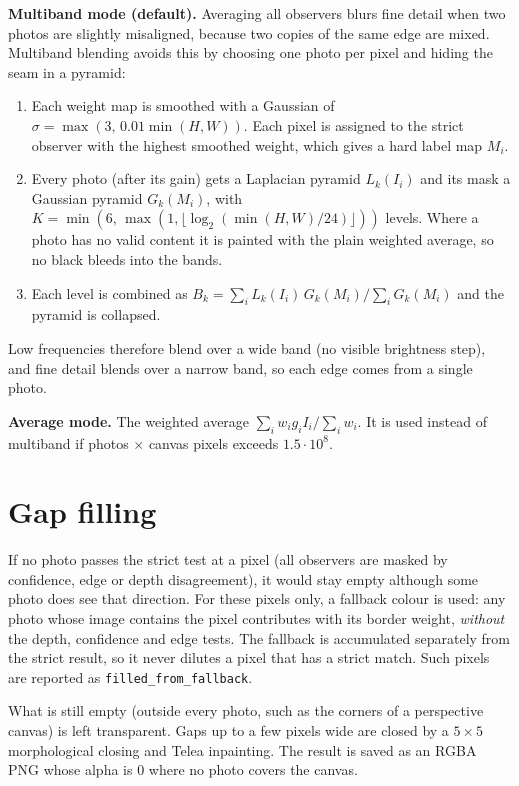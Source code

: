 \documentclass[11pt, a4paper]{article}
\begin{document}
\textbf{Multiband mode (default).} Averaging all observers blurs fine detail when two photos are slightly misaligned, because two copies of the same
edge are mixed. Multiband blending avoids this by choosing one photo per pixel and hiding the seam in a pyramid:
\begin{enumerate}
  \item Each weight map is smoothed with a Gaussian of $\sigma = \max(3,\,0.01\min(H,W))$. Each pixel is assigned to the strict
        observer with the highest smoothed weight, which gives a hard label map $M_i$.
  \item Every photo (after its gain) gets a Laplacian pyramid $L_k(I_i)$ and its mask a Gaussian pyramid $G_k(M_i)$, with
        $K = \min(6,\,\max(1,\lfloor\log_2(\min(H,W)/24)\rfloor))$ levels. Where a photo has no valid content it is painted
        with the plain weighted average, so no black bleeds into the bands.
  \item Each level is combined as $B_k = \sum_i L_k(I_i)\,G_k(M_i) \big/ \sum_i G_k(M_i)$ and the pyramid is collapsed.
\end{enumerate}
Low frequencies therefore blend over a wide band (no visible brightness step), and fine detail blends over a narrow band, so each edge comes from a single photo.

\textbf{Average mode.} The weighted average $\sum_i w_i g_i I_i / \sum_i w_i$. It is used instead of multiband if photos
$\times$ canvas pixels exceeds $1.5\cdot 10^8$.

\section{Gap filling}

If no photo passes the strict test at a pixel (all observers are masked by confidence, edge or depth disagreement), it would stay empty
although some photo does see that direction. For these pixels only, a fallback colour is used: any photo whose image contains the
pixel contributes with its border weight, \emph{without} the depth, confidence and edge tests. The fallback is accumulated separately
from the strict result, so it never dilutes a pixel that has a strict match. Such pixels are reported as \texttt{filled\_from\_fallback}.

What is still empty (outside every photo, such as the corners of a perspective canvas) is left transparent. Gaps up to a few pixels wide are closed by a
$5\times5$ morphological closing and Telea inpainting. The result is saved as an RGBA PNG whose alpha is 0 where no photo covers the canvas.
\end{document}

